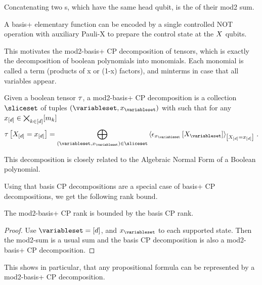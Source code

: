 Concatenating two \computationCircuit{}s, which have the same head qubit, is the \computationCircuit{} of their mod2 sum.


A basis+ elementary function can be encoded by a single controlled NOT operation with auxiliary Pauli-X to prepare the control state at the $X$ qubits.

This motivates the mod2-basis+ CP decomposition of tensors, which is exactly the decomposition of boolean polynomials into monomials.
Each monomial is called a term (products of x or (1-x) factors), and minterms in case that all variables appear.

\begin{definition}
    Given a boolean tensor $\tau$, a mod2-basis+ CP decomposition is a collection $\sliceset$ of tuples $(\variableset,\catindexof{\variableset})$ with such that for any $x_{[d]}\in\bigtimes_{k\in[d]}[m_{k}]$
    \begin{align*}
        \hypercoreat{\indexedshortcatvariables}
        = \bigoplus_{(\variableset,\catindexof{\variableset})\in\sliceset} \contractionof{\onehotmapofat{\catindexof{\variableset}}{\catvariableof{\variableset}}}{\indexedshortcatvariables} \, .
    \end{align*}
\end{definition}



This decomposition is closely related to the Algebraic Normal Form of a Boolean polynomial.

Using that basis CP decompositions are a special case of basis+ CP decompositions, we get the following rank bound.

\begin{lemma}
    The mod2-basis+ CP rank is bounded by the basis CP rank.
\end{lemma}
\begin{proof}
    Use $\variableset=[\atomorder]$, and $\catindexof{\variableset}$ to each supported state.
    Then the mod2-sum is a usual sum and the basis CP decomposition is also a mod2-basis+ CP decomposition.
\end{proof}

This shows in particular, that any propositional formula can be represented by a mod2-basis+ CP decomposition.

